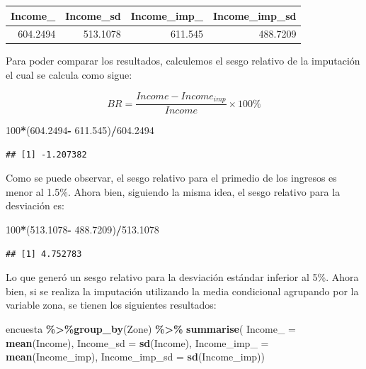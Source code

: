 \documentclass[
  spanish,
  12pt,
]{book}
\newenvironment{Shaded}{\begin{snugshade}}{\end{snugshade}}
\newcommand{\AttributeTok}[1]{\textcolor[rgb]{0.13,0.29,0.53}{#1}}
\newcommand{\DecValTok}[1]{\textcolor[rgb]{0.00,0.00,0.81}{#1}}
\newcommand{\FloatTok}[1]{\textcolor[rgb]{0.00,0.00,0.81}{#1}}
\newcommand{\FunctionTok}[1]{\textcolor[rgb]{0.13,0.29,0.53}{\textbf{#1}}}
\newcommand{\NormalTok}[1]{#1}
\newcommand{\SpecialCharTok}[1]{\textcolor[rgb]{0.81,0.36,0.00}{\textbf{#1}}}
\begin{document}
\begin{tabular}{r|r|r|r}
\hline
Income\_ & Income\_sd & Income\_imp\_ & Income\_imp\_sd\\
\hline
604.2494 & 513.1078 & 611.545 & 488.7209\\
\hline
\end{tabular}

Para poder comparar los resultados, calculemos el sesgo relativo de la imputación el cual se calcula como sigue:

\[
BR=\frac{Income-Income_{imp}}{Income}\times100\%
\]

\begin{Shaded}
\begin{Highlighting}[]
\DecValTok{100}\SpecialCharTok{*}\NormalTok{(}\FloatTok{604.2494}\SpecialCharTok{{-}} \FloatTok{611.545}\NormalTok{)}\SpecialCharTok{/}\FloatTok{604.2494}
\end{Highlighting}
\end{Shaded}

\begin{verbatim}
## [1] -1.207382
\end{verbatim}

Como se puede observar, el sesgo relativo para el primedio de los ingresos es menor al 1.5\%. Ahora bien, siguiendo la misma idea, el sesgo relativo para la desviación es:

\begin{Shaded}
\begin{Highlighting}[]
\DecValTok{100}\SpecialCharTok{*}\NormalTok{(}\FloatTok{513.1078}\SpecialCharTok{{-}} \FloatTok{488.7209}\NormalTok{)}\SpecialCharTok{/}\FloatTok{513.1078}
\end{Highlighting}
\end{Shaded}

\begin{verbatim}
## [1] 4.752783
\end{verbatim}

Lo que generó un sesgo relativo para la desviación estándar inferior al 5\%. Ahora bien, si se realiza la imputación utilizando la media condicional agrupando por la variable zona, se tienen los siguientes resultados:

\begin{Shaded}
\begin{Highlighting}[]
\NormalTok{encuesta }\SpecialCharTok{\%\textgreater{}\%}\FunctionTok{group\_by}\NormalTok{(Zone) }\SpecialCharTok{\%\textgreater{}\%}  \FunctionTok{summarise}\NormalTok{(}
  \AttributeTok{Income\_ =} \FunctionTok{mean}\NormalTok{(Income),}
  \AttributeTok{Income\_sd =} \FunctionTok{sd}\NormalTok{(Income),}
  \AttributeTok{Income\_imp\_ =} \FunctionTok{mean}\NormalTok{(Income\_imp),}
  \AttributeTok{Income\_imp\_sd =} \FunctionTok{sd}\NormalTok{(Income\_imp))}
\end{Highlighting}
\end{Shaded}
\end{document}
